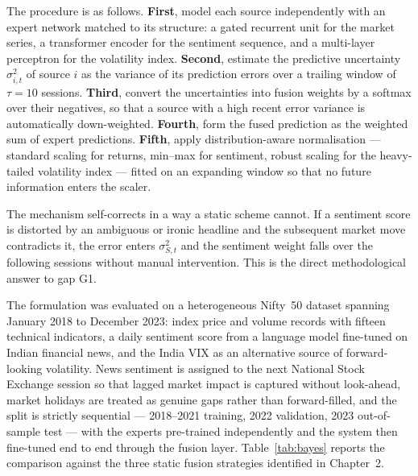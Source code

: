 The procedure is as follows. \textbf{First}, model each source independently with an
expert network matched to its structure: a gated recurrent unit for the market series, a
transformer encoder for the sentiment sequence, and a multi-layer perceptron for the
volatility index. \textbf{Second}, estimate the predictive uncertainty $\sigma_{i,t}^2$ of
source $i$ as the variance of its prediction errors over a trailing window of
$\tau = 10$ sessions. \textbf{Third}, convert the uncertainties into fusion weights by a
softmax over their negatives, so that a source with a high recent error variance is
automatically down-weighted. \textbf{Fourth}, form the fused prediction as the weighted
sum of expert predictions. \textbf{Fifth}, apply distribution-aware normalisation ---
standard scaling for returns, min--max for sentiment, robust scaling for the heavy-tailed
volatility index --- fitted on an expanding window so that no future information enters
the scaler.

The mechanism self-corrects in a way a static scheme cannot. If a sentiment score is
distorted by an ambiguous or ironic headline and the subsequent market move contradicts
it, the error enters $\sigma_{S,t}^2$ and the sentiment weight falls over the following
sessions without manual intervention. This is the direct methodological answer to gap G1.

The formulation was evaluated on a heterogeneous Nifty~50 dataset spanning January 2018 to
December 2023: index price and volume records with fifteen technical indicators, a daily
sentiment score from a language model fine-tuned on Indian financial news, and the India
VIX as an alternative source of forward-looking volatility. News sentiment is assigned to
the next National Stock Exchange session so that lagged market impact is captured without
look-ahead, market holidays are treated as genuine gaps rather than forward-filled, and
the split is strictly sequential --- 2018--2021 training, 2022 validation, 2023
out-of-sample test --- with the experts pre-trained independently and the system then
fine-tuned end to end through the fusion layer. Table~\ref{tab:bayes} reports the
comparison against the three static fusion strategies identified in Chapter~2.

